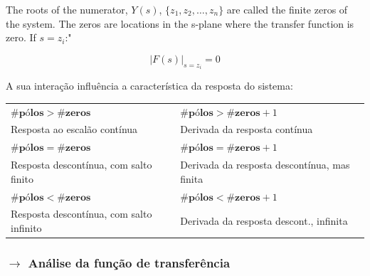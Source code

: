 \noindent The roots of the numerator, $Y(s)$, $\{z_1,z_2, \dots, z_n\}$ are called the finite zeros of the system. The zeros are locations in the s-plane where the transfer function is zero. If $s = z_i$:"\cite{FranklinPowell2015}

$$
    \boxed{|F(s)|_{s = z_i} = 0}
$$

\noindent A sua interação influência a característica da resposta do sistema:

{\setlength{\tabcolsep}{16pt}
\begin{center}
    \begin{tabular}{p{} | p{}}
        \centerline{\underline{$\#\textbf{pólos} > \#\textbf{zeros}$}} & \centerline{\underline{$\#\textbf{pólos} > \#\textbf{zeros}+1$}} \\[-14pt]
        Resposta ao escalão contínua & Derivada da resposta contínua \\[4pt]
        \centerline{\underline{$\#\textbf{pólos} = \#\textbf{zeros}$}} & \centerline{\underline{$\#\textbf{pólos} = \#\textbf{zeros}+1$}} \\[-14pt]
        Resposta descontínua, com salto finito & Derivada da resposta descontínua, mas finita \\[4pt]
        \centerline{\underline{$\#\textbf{pólos} < \#\textbf{zeros}$}} & \centerline{\underline{$\#\textbf{pólos} < \#\textbf{zeros}+1$}} \\[-14pt]
        Resposta descontínua, com salto infinito & Derivada da resposta descont.,  infinita \\
        \bottomrule
    \end{tabular}
\end{center}
}

\newpage
\subsubsection[2.1.1 Análise da função de transferência]{$\pmb{\rightarrow}$ Análise da função de transferência}

